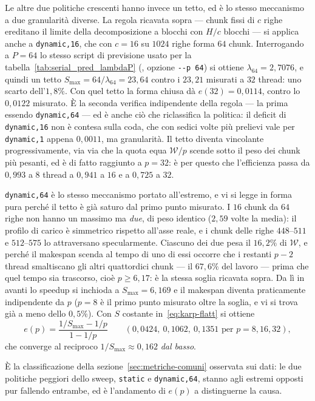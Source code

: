 Le altre due politiche crescenti hanno invece un tetto, ed è lo stesso
meccanismo a due granularità diverse. La regola ricavata sopra --- chunk fissi
di $c$ righe ereditano il limite della decomposizione a blocchi con $H/c$
blocchi --- si applica anche a \texttt{dynamic,16}, che con $c = 16$ su $1024$
righe forma $64$ chunk. Interrogando a $P = 64$ lo stesso script di previsione
usato per la tabella~\ref{tab:serial_pred_lambdaP}
(, opzione \texttt{-{}-p 64})
si ottiene $\lambda_{64} = 2{,}7076$, e quindi un tetto
$S_{\max} = 64/\lambda_{64} = 23{,}64$ contro i $23{,}21$ misurati a $32$
thread: uno scarto dell'$1{,}8\%$. Con quel tetto la forma chiusa dà
$e(32) = 0{,}0114$, contro lo $0{,}0122$ misurato. È la seconda verifica
indipendente della regola --- la prima essendo \texttt{dynamic,64} --- ed è
anche ciò che riclassifica la politica: il deficit di \texttt{dynamic,16} non è
contesa sulla coda, che con sedici volte più prelievi vale per
\texttt{dynamic,1} appena $0{,}0011$, ma granularità. Il tetto diventa vincolante
progressivamente, via via che la quota equa $\mathcal{W}/p$ scende sotto il peso
dei chunk più pesanti, ed è di fatto raggiunto a $p=32$: è per questo che
l'efficienza passa da $0{,}993$ a $8$ thread a $0{,}941$ a $16$ e a $0{,}725$ a
$32$.

\texttt{dynamic,64} è lo stesso meccanismo portato all'estremo, e vi si legge in
forma pura perché il tetto è già saturo dal primo punto misurato. I $16$ chunk
da $64$ righe non hanno un massimo ma \emph{due}, di peso identico ($2{,}59$
volte la media): il profilo di carico è simmetrico rispetto all'asse reale, e i
chunk delle righe $448$--$511$ e $512$--$575$ lo attraversano specularmente.
Ciascuno dei due pesa il $16{,}2\%$ di $\mathcal{W}$, e perché il makespan
scenda al tempo di uno di essi occorre che i restanti $p-2$ thread smaltiscano
gli altri quattordici chunk --- il $67{,}6\%$ del lavoro --- prima che quel
tempo sia trascorso, cioè $p \ge 6{,}17$: è la stessa soglia ricavata
sopra. Da lì in avanti lo speedup si inchioda
a $S_{\max} = 6{,}169$ e il makespan diventa praticamente indipendente da $p$
($p = 8$ è il primo punto misurato oltre la soglia, e vi si trova già a meno
dello $0{,}5\%$). Con $S$ costante in~\eqref{eq:karp-flatt} si ottiene
\[
    e(p) = \frac{1/S_{\max} - 1/p}{1 - 1/p}
    \qquad
    (0{,}0424,\ 0{,}1062,\ 0{,}1351 \text{ per } p = 8, 16, 32),
\]
che converge al reciproco $1/S_{\max} \approx 0{,}162$ \emph{dal basso}.

È la classificazione della sezione~\ref{sec:metriche-comuni} osservata sui dati:
le due politiche peggiori dello sweep, \texttt{static} e \texttt{dynamic,64},
stanno agli estremi opposti pur fallendo entrambe, ed è l'andamento di $e(p)$ a
distinguerne la causa.

